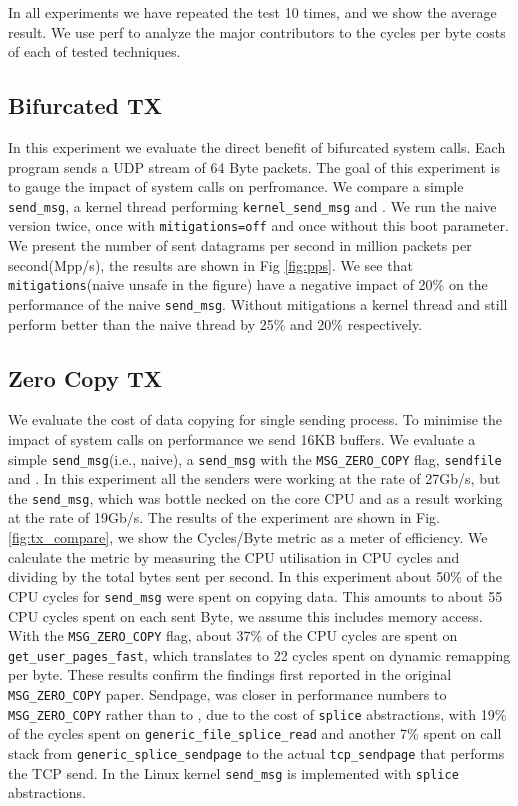 In all experiments we have repeated the test 10 times, and we show the average result. We use perf\cite{perf} to analyze the major contributors to the cycles per byte costs of each of tested techniques.

\subsection{Bifurcated TX}\label{sec:eval_bif}
In this experiment we evaluate the direct benefit of bifurcated system calls. Each program sends a UDP stream of 64 Byte packets. The goal of this experiment is to gauge the impact of system calls on perfromance. We compare a simple \texttt{send\_msg}, a kernel thread performing \texttt{kernel\_send\_msg} and \oursys. We run the naive version twice, once with \texttt{mitigations=off}\cite{mitigations} and once without this boot parameter. We present the number of sent datagrams per second in million packets per second(Mpp/s), the results are shown in Fig \ref{fig:pps}. We see that \texttt{mitigations}(naive unsafe in the figure) have a negative impact of 20\% on the performance of the naive \texttt{send\_msg}. Without mitigations a kernel thread and \oursys still perform better than the naive thread by 25\% and 20\% respectively.

\subsection{Zero Copy TX}
We evaluate the cost of data copying for single sending process. To minimise the impact of system calls on performance we send 16KB buffers. We evaluate a simple \texttt{send\_msg}(i.e., naive), a \texttt{send\_msg} with the \texttt{MSG\_ZERO\_COPY} flag, \texttt{sendfile} and \oursys. In this experiment all the senders were working at the rate of 27Gb/s, but the \texttt{send\_msg}, which was bottle necked on the core CPU and as a result working at the rate of 19Gb/s. The results of the experiment are shown in Fig. \ref{fig:tx_compare}, we show the Cycles/Byte metric as a meter of efficiency. We calculate the metric by measuring the CPU utilisation in CPU cycles and dividing by the total bytes sent per second. In this experiment about 50\% of the CPU cycles for \texttt{send\_msg} were spent on copying data. This amounts to about 55 CPU cycles spent on each sent Byte, we assume this includes memory access. With the \texttt{MSG\_ZERO\_COPY} flag, about 37\% of the CPU cycles are spent on \texttt{get\_user\_pages\_fast}, which translates to 22 cycles spent on dynamic remapping per byte. These results confirm the findings first reported in the original \texttt{MSG\_ZERO\_COPY} paper\cite{desendmsg}. Sendpage, was closer in performance numbers to \texttt{MSG\_ZERO\_COPY} rather than to \oursys, due to the cost of \texttt{splice} abstractions, with 19\% of the cycles spent on \texttt{generic\_file\_splice\_read} and another 7\% spent on call stack from \texttt{generic\_splice\_sendpage} to the actual \texttt{tcp\_sendpage} that performs the TCP send. In the Linux kernel \texttt{send\_msg} is implemented with \texttt{splice} abstractions.

